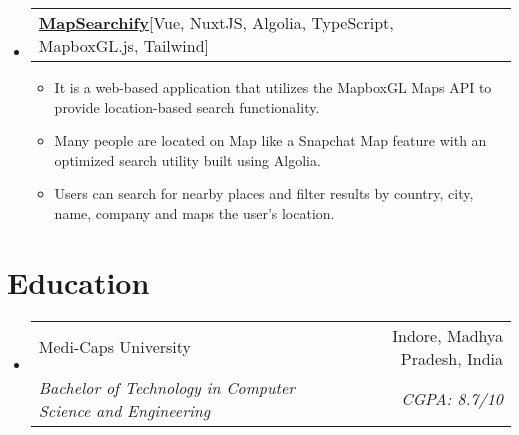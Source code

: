 \documentclass[letterpaper,10pt]{article}
\makeatletter
\newcommand{\resumeItem}[1]{
  \item\small{
    {#1 \vspace{-2pt}}
  }
}
\newcommand{\resumeProjectHeading}[2]{
    \item
    \begin{tabular*}{0.97\textwidth}{l@{\extracolsep{\fill}}r}
      \small#1 & #2 \\
    \end{tabular*}\vspace{-5pt}
}
\newcommand{\resumeEduheading}[4]{
\vspace{2pt}\item
  \begin{tabular*}{0.97\textwidth}[t]{l@{\extracolsep{\fill}}r}
    {#1} & #2 \\
    \textit{\small#3} & \textit{\small #4}\\
  \end{tabular*}\vspace{-7pt}
}
\newcommand{\resumeSubHeadingListStart}{\begin{itemize}[leftmargin=0.15in, label={}]}
\newcommand{\resumeSubHeadingListEnd}{\end{itemize}}
\newcommand{\resumeItemListStart}{\begin{itemize}}
\newcommand{\resumeItemListEnd}{\end{itemize}}
\makeatother
\begin{document}
\resumeSubHeadingListStart
\resumeProjectHeading
{\textbf{\href{https://github.com/ayushsoni1010/mapsearchify}{MapSearchify}\hspace{5pt}}{{[Vue, NuxtJS, Algolia, TypeScript, MapboxGL.js, Tailwind]}}}{}
\resumeItemListStart
\resumeItem{It is a web-based application that utilizes the MapboxGL Maps API to provide location-based search functionality.}
\resumeItem{Many people are located on Map like a Snapchat Map feature with an optimized search utility built using Algolia.}
\resumeItem{Users can search for nearby places and filter results by country, city, name, company and maps the user's location.}
\resumeItemListEnd
\resumeSubHeadingListEnd



\section{Education}
\resumeSubHeadingListStart
\resumeEduheading
{Medi-Caps University}{Indore, Madhya Pradesh, India}
{Bachelor of Technology in Computer Science and Engineering}{CGPA: 8.7/10}
\resumeSubHeadingListEnd



\end{document}
